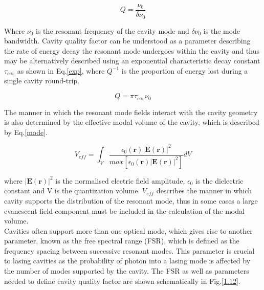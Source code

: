 \begin{equation}\label{Q-fac}
Q = \frac{\nu_{0}}{\delta\nu_{0}}
\end{equation}

Where $\nu_{0}$ is the resonant frequency of the cavity mode and $\delta\nu_{0}$ is the mode bandwidth. Cavity quality factor can be understood as a parameter describing the rate of energy decay the resonant mode undergoes within the cavity and thus may be alternatively described using an exponential characteristic decay constant $\tau_{cav}$ as shown in Eq.\ref{exp}, where $Q^{-1}$ is the proportion of energy lost during a single cavity round-trip.

\begin{equation}\label{exp}
Q = \pi\tau_{cav} \nu_{0}
\end{equation}

The manner in which the resonant mode fields interact with the cavity geometry is also determined by the effective modal volume of the cavity, which is described by Eq.\ref{mode}.

\begin{equation}\label{mode}
V_{eff}= \int_{V}\frac{\epsilon_{0}(\mathbf{r})|\mathbf{E}(\mathbf{r})|^{2}}{max[\epsilon_{0}(\mathbf{r})|\mathbf{E}(\mathbf{r})|^{2}]}dV
\end{equation}

where $|\mathbf{E}(\mathbf{r})|^{2}$ is the normalised electric field amplitude, $\epsilon_{0}$ is the dielectric constant and V is the quantization volume. $V_{eff}$ describes the manner in which cavity supports the distribution of the resonant mode, thus in some cases a large evanescent field component must be included in the calculation of the modal volume.
\\ Cavities often support more than one optical mode, which gives rise to another parameter, known as the free spectral range  (FSR), which is defined as the frequency spacing between successive resonant modes. This parameter is crucial to lasing cavities as the probability of photon into a lasing mode is affected by the number of modes supported by the cavity. The FSR as well as parameters needed to define cavity quality factor are shown schematically in Fig.\ref{1.12}. 

